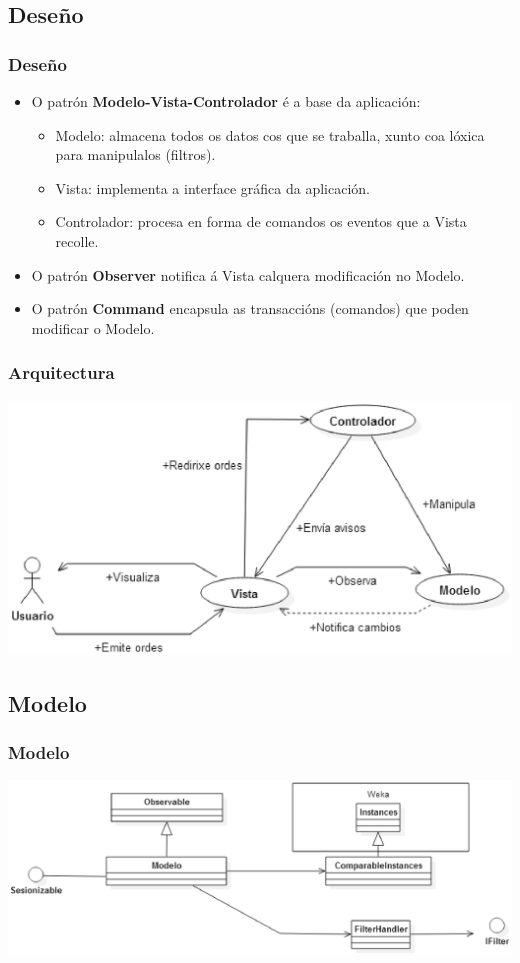 \documentclass{beamer}
\begin{document}
\subsection{Deseño}
\begin{frame}
\frametitle{Deseño} 
\begin{itemize} 
\item O patrón \textbf{Modelo-Vista-Controlador} é a base da aplicación:
\begin{itemize} 
\item Modelo: almacena todos os datos cos que se traballa, xunto coa lóxica para manipulalos (filtros).
\item Vista: implementa a interface gráfica da aplicación.
\item Controlador: procesa en forma de comandos os eventos que a Vista recolle.
\end{itemize} 
\item O patrón \textbf{Observer} notifica á Vista calquera modificación no Modelo.
\item O patrón \textbf{Command} encapsula as transaccións (comandos) que poden modificar o Modelo.
\end{itemize} 
\end{frame}
\begin{frame}
\frametitle{Arquitectura} 
\includegraphics[width=\textwidth,height=\textheight,keepaspectratio]{figuras/MVC}
\end{frame}
\subsection{Modelo}
\begin{frame}
\frametitle{Modelo} 
\includegraphics[width=\textwidth,height=\textheight,keepaspectratio]{figuras/modeloPresentacion}
\end{frame}
\end{document}
